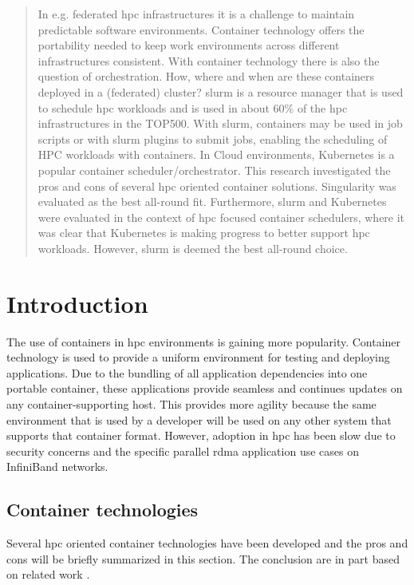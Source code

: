 \documentclass[12pt]{article}
\begin{document}
\begin{abstract}
In e.g. federated \gls{hpc} infrastructures it is a challenge to maintain predictable software environments. Container technology offers the portability needed to keep work environments across different infrastructures consistent. With container technology there is also the question of orchestration. How, where and when are these containers deployed in a  (federated) cluster? \gls{slurm} is a resource manager that is used to schedule \gls{hpc} workloads and is used in about 60\% of the \gls{hpc} infrastructures in the TOP500. With \gls{slurm}, containers may be used in job scripts or with \gls{slurm} plugins to submit jobs, enabling the scheduling of HPC workloads with containers. In Cloud environments, Kubernetes is a popular container scheduler/orchestrator. This research investigated the pros and cons of several \gls{hpc} oriented container solutions. Singularity was evaluated as the best all-round fit. Furthermore, \gls{slurm} and Kubernetes were evaluated in the context of \gls{hpc} focused container schedulers, where it was clear that Kubernetes is making progress to better support \gls{hpc} workloads. However, \gls{slurm} is deemed the best all-round choice.
\end{abstract}

\newpage
\tableofcontents
\newpage



\section{Introduction}
\label{introduction}
The use of containers in \gls{hpc} environments is gaining more popularity. Container technology is used to provide a uniform environment for testing and deploying applications. Due to the bundling of all application dependencies into one portable container, these applications provide seamless and continues updates on any container-supporting host. This provides more agility because the same environment that is used by a developer will be used on any other system that supports that container format. However, adoption in \gls{hpc} has been slow due to security concerns and the specific parallel \gls{rdma} application use cases on InfiniBand networks.


\subsection{Container technologies}
Several \gls{hpc} oriented container technologies have been developed and the pros and cons will be briefly summarized in this section. The conclusion are in part based on related work \cite{hpc-workloads-justin, saha2018evaluation, stackhpc-state-of-hpc}.
\end{document}
